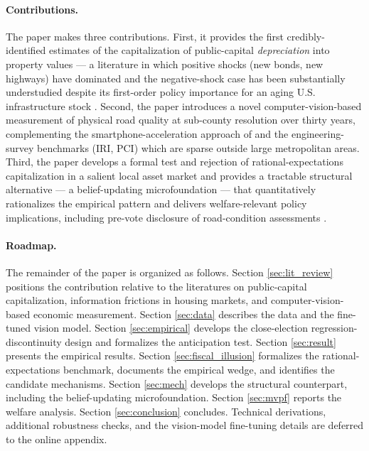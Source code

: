 \paragraph{Contributions.}
The paper makes three contributions. First, it provides the first credibly-identified estimates of the capitalization of public-capital {\it depreciation} into property values --- a literature in which positive shocks (new bonds, new highways) have dominated and the negative-shock case has been substantially understudied despite its first-order policy importance for an aging U.S. infrastructure stock \citep{asce2025report, ramey2021infrastructure}. Second, the paper introduces a novel computer-vision-based measurement of physical road quality at sub-county resolution over thirty years, complementing the smartphone-acceleration approach of \cite{currier2023} and the engineering-survey benchmarks (IRI, PCI) which are sparse outside large metropolitan areas. Third, the paper develops a formal test and rejection of rational-expectations capitalization in a salient local asset market and provides a tractable structural alternative --- a belief-updating microfoundation --- that quantitatively rationalizes the empirical pattern and delivers welfare-relevant policy implications, including pre-vote disclosure of road-condition assessments \citep[in the spirit of][]{brasington2024fire, chetty2009salience}.

\paragraph{Roadmap.}
The remainder of the paper is organized as follows. Section \ref{sec:lit_review} positions the contribution relative to the literatures on public-capital capitalization, information frictions in housing markets, and computer-vision-based economic measurement. Section \ref{sec:data} describes the data and the fine-tuned vision model. Section \ref{sec:empirical} develops the close-election regression-discontinuity design and formalizes the anticipation test. Section \ref{sec:result} presents the empirical results. Section \ref{sec:fiscal_illusion} formalizes the rational-expectations benchmark, documents the empirical wedge, and identifies the candidate mechanisms. Section \ref{sec:mech} develops the structural counterpart, including the belief-updating microfoundation. Section \ref{sec:mvpf} reports the welfare analysis. Section \ref{sec:conclusion} concludes. Technical derivations, additional robustness checks, and the vision-model fine-tuning details are deferred to the online appendix.

